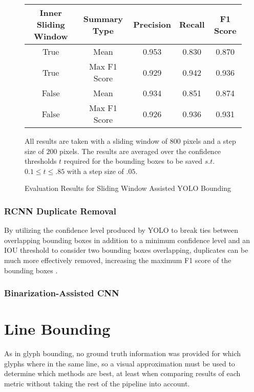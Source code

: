 \begin{figure}[H]
    \caption{Evaluation Results for Sliding Window Assisted YOLO Bounding}
    \label{fig:evalYOLOSliding}
    \begin{center}
      \begin{tabular}{ | c | c | c | c | c | }
          \hline
          Inner Sliding Window & Summary Type & Precision & Recall & F1 Score \\
          \hline
          True & Mean & 0.953	& 0.830 & 0.870 \\
          True & Max F1 Score & 0.929 & 0.942 & 0.936 \\
          False & Mean & 0.934 & 0.851 & 0.874 \\
          False & Max F1 Score & 0.926 & 0.936 & 0.931 \\
          \hline
      \end{tabular}
    \end{center}
    \vspace{5mm}
    All results are taken with a sliding window of $800$ pixels and a step size of $200$ pixels. The results are averaged over the confidence thresholds $t$ required for the bounding boxes to be saved $s.t.$ $0.1 \leq t \leq .85$ with a step size of $.05$.
\end{figure}

\subsubsection{RCNN Duplicate Removal}

By utilizing the confidence level produced by YOLO to break ties between overlapping bounding boxes in addition to a minimum confidence level and an IOU threshold to consider two bounding boxes overlapping, duplicates can be much more effectively removed, increasing the maximum F1 score of the bounding boxes .


\subsubsection{Binarization-Assisted CNN}

\section{Line Bounding}

As in glyph bounding, no ground truth information was provided for which glyphs where in the same line, so a visual approximation must be used to determine which methods are best, at least when comparing results of each metric without taking the rest of the pipeline into account.

